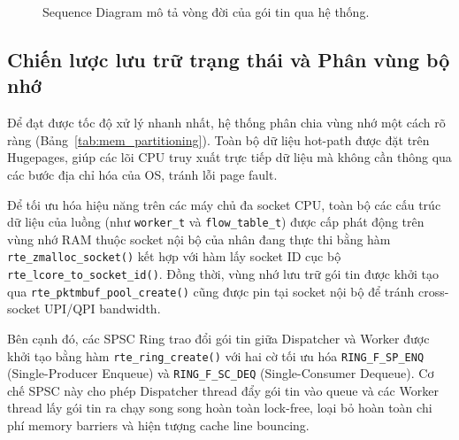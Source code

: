 \documentclass[12pt,a4paper,twoside]{report}
\begin{document}
\begin{figure}[htbp]
{
    }
    \caption{Sequence Diagram mô tả vòng đời của gói tin qua hệ thống.}
    \label{fig:sequence_diag}
\end{figure}


\subsection{Chiến lược lưu trữ trạng thái và Phân vùng bộ nhớ}
Để đạt được tốc độ xử lý nhanh nhất, hệ thống phân chia vùng nhớ một cách rõ ràng (Bảng~\ref{tab:mem_partitioning}). Toàn bộ dữ liệu hot-path được đặt trên Hugepages, giúp các lõi CPU truy xuất trực tiếp dữ liệu mà không cần thông qua các bước địa chỉ hóa của OS, tránh lỗi page fault.

Để tối ưu hóa hiệu năng trên các máy chủ đa socket CPU, toàn bộ các cấu trúc dữ liệu của luồng (như \texttt{worker\_t} và \texttt{flow\_table\_t}) được cấp phát động trên vùng nhớ RAM thuộc socket nội bộ của nhân đang thực thi bằng hàm \texttt{rte\_zmalloc\_socket()} kết hợp với hàm lấy socket ID cục bộ \texttt{rte\_lcore\_to\_socket\_id()}. Đồng thời, vùng nhớ lưu trữ gói tin được khởi tạo qua \texttt{rte\_pktmbuf\_pool\_create()} cũng được pin tại socket nội bộ để tránh cross-socket UPI/QPI bandwidth.

Bên cạnh đó, các SPSC Ring trao đổi gói tin giữa Dispatcher và Worker được khởi tạo bằng hàm \texttt{rte\_ring\_create()} với hai cờ tối ưu hóa \texttt{RING\_F\_SP\_ENQ} (Single-Producer Enqueue) và \texttt{RING\_F\_SC\_DEQ} (Single-Consumer Dequeue). Cơ chế SPSC này cho phép Dispatcher thread đẩy gói tin vào queue và các Worker thread lấy gói tin ra chạy song song hoàn toàn lock-free, loại bỏ hoàn toàn chi phí memory barriers và hiện tượng cache line bouncing.
\end{document}

